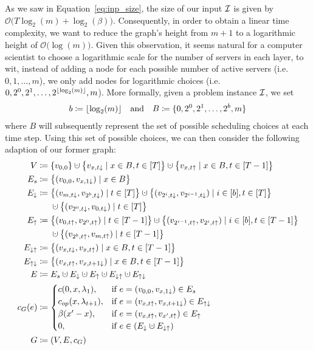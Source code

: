 As we saw in Equation~\eqref{eq:inp_size}, the size of our input $\mathcal{I}$ is given by $\mathcal{O}\bigl(T\log_2(m)+\log_2(\beta)\bigr)$. Consequently, in order to obtain a linear time complexity, we want to reduce the graph's height from $m+1$ to a logarithmic height of $\mathcal{O}\bigl(\log(m)\bigr)$. Given this observation, it seems natural for a computer scientist to choose a logarithmic scale for the number of servers in each layer, to wit, instead of adding a node for each possible number of active servers (i.e.\ $0,1,\dotsc,m$), we only add nodes for logarithmic choices (i.e.\ $0,2^0,2^1,\dotsc,2^{\lfloor\log_2(m)\rfloor},m$). More formally, given a problem instance $\mathcal{I}$, we set
\begin{align*}
	b\coloneqq\lfloor\log_2(m)\rfloor&&\text{and}&&B\coloneqq\{0,2^0,2^1,\dotsc,2^b,m\}
\end{align*}
where $B$ will subsequently represent the set of possible scheduling choices at each time step. Using this set of possible choices, we can then consider the following adaption of our former graph:
\begin{align*}
	V&\coloneqq\{v_{0,0}\}\dotcup\bigl\{v_{x,t\downarrow}\mid x\in B,t\in[T]\bigr\}\dotcup\bigl\{v_{x,t\uparrow}\mid x\in B, t\in[T-1]\bigr\}\\
	E_s&\coloneqq\bigl\{(v_{0,0},v_{x,1\downarrow})\mid x\in B\bigr\}\\
	E_\downarrow&\coloneqq\bigl\{(v_{m,t\downarrow},v_{2^b,t\downarrow})\mid t\in[T]\bigr\}\dotcup\bigl\{(v_{2^i,t\downarrow},v_{2^{i-1},t\downarrow})\mid i\in[b],t\in[T]\bigr\}\\
	&\phantom{{}\coloneqq{}}\dotcup\bigl\{(v_{2^0,t\downarrow},v_{0,t\downarrow})\mid t\in[T]\bigr\}\\
	E_\uparrow&\coloneqq\bigl\{(v_{0,t\uparrow},v_{2^0,t\uparrow})\mid t\in[T-1]\bigr\}\dotcup\bigl\{(v_{2^{i-1},t\uparrow},v_{2^i,t\uparrow})\mid i\in[b],t\in[T-1]\bigr\}\\
	&\phantom{{}\coloneqq{}}\dotcup\bigl\{(v_{2^b,t\uparrow},v_{m,t\uparrow})\mid t\in[T-1]\bigr\}\\
	E_{\downarrow\uparrow}&\coloneqq\bigl\{(v_{x,t\downarrow},v_{x,t\uparrow})\mid x\in B,t\in[T-1]\bigr\}\\
	E_{\uparrow\downarrow}&\coloneqq\bigl\{(v_{x,t\uparrow},v_{x,t+1\downarrow})\mid x\in B,t\in[T-1]\bigr\}\\
	E&\coloneqq E_s\dotcup E_\downarrow\dotcup E_\uparrow\dotcup E_{\downarrow\uparrow}\dotcup E_{\uparrow\downarrow}\\
	c_G(e)&\coloneqq
	\begin{cases}
		\costs(0,x,\lambda_1), & \text{if $e=(v_{0,0},v_{x,1\downarrow})\in E_s$}\\
		\opcosts(x,\lambda_{t+1}), & \text{if $e=(v_{x,t\uparrow},v_{x,t+1\downarrow})\in E_{\uparrow\downarrow}$}\\
		\beta(x'-x), & \text{if $e=(v_{x,t\uparrow},v_{x',t\uparrow})\in E_\uparrow$}\\
		0, & \text{if $e\in(E_\downarrow\dotcup E_{\downarrow\uparrow})$}
	\end{cases}\\
	G&\coloneqq(V,E,c_G)
\end{align*}
